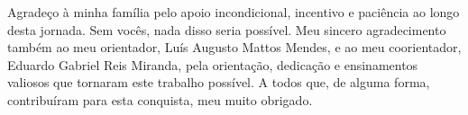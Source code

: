\documentclass[
        oneside,      %
        english,
        brazil
        ]{configcefetmglpd}
\begin{document}


\printacapa

\printafolhaderosto{}

\printacatalog


\printafolhaaprov{}




\begin{agradecimentos}
Agradeço à minha família pelo apoio incondicional, incentivo e paciência ao longo desta jornada. Sem vocês, nada disso seria possível.
Meu sincero agradecimento também ao meu orientador, Luís Augusto Mattos Mendes, e ao meu coorientador, Eduardo Gabriel Reis Miranda, pela orientação, dedicação e ensinamentos valiosos que tornaram este trabalho possível.
A todos que, de alguma forma, contribuíram para esta conquista, meu muito obrigado.

\end{agradecimentos}


\end{document}
